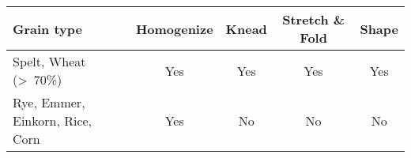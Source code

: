 \begin{tabular}{@{}lcccc@{}}
\toprule
\textbf{Grain type}        & \textbf{Homogenize} & \textbf{Knead} & \textbf{Stretch \& Fold} & \textbf{Shape} \\ \midrule
Spelt, Wheat (\textgreater{}~70\%) & Yes & Yes & Yes & Yes \\
Rye, Emmer, Einkorn, Rice, Corn    & Yes & No  & No  & No  \\ \bottomrule
\end{tabular}

